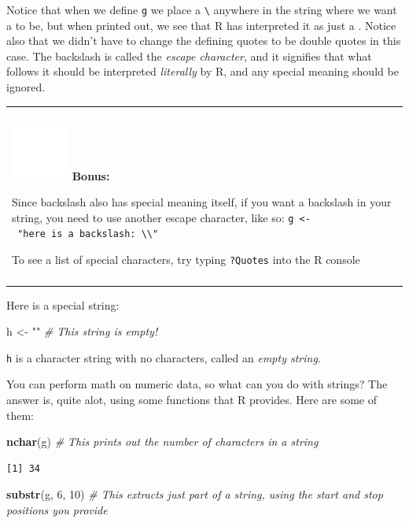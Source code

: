 \documentclass[
]{book}
\newenvironment{Shaded}{\begin{snugshade}}{\end{snugshade}}
\newcommand{\CommentTok}[1]{\textcolor[rgb]{0.56,0.35,0.01}{\textit{#1}}}
\newcommand{\DecValTok}[1]{\textcolor[rgb]{0.00,0.00,0.81}{#1}}
\newcommand{\KeywordTok}[1]{\textcolor[rgb]{0.13,0.29,0.53}{\textbf{#1}}}
\newcommand{\NormalTok}[1]{#1}
\newcommand{\StringTok}[1]{\textcolor[rgb]{0.31,0.60,0.02}{#1}}
\newenvironment{bonus}
{
  \begin{center}
  \begin{tabular}{|>{\columncolor{bonus}\color{white}}p{0.9\textwidth}|}\hline\\
  \includegraphics[scale=0.1]{src/images/sun-fill-invert.png}
  \textbf{Bonus:}
}
{\\\\\hline
  \end{tabular}
  \end{center}
}
\begin{document}
Notice that when we define \texttt{g} we place a \texttt{\textbackslash{}\textquotesingle{}} anywhere in the string where we want a \texttt{\textquotesingle{}} to be, but when printed out, we see that R has interpreted it as just a \texttt{\textquotesingle{}}.
Notice also that we didn't have to change the defining quotes to be double quotes in this case.
The backslash is called the \emph{escape character}, and it signifies that what follows it should be interpreted \emph{literally} by R, and any special meaning should be ignored.

\begin{bonus}
Since backslash also has special meaning itself, if you want a backslash
in your string, you need to use another escape character, like so:
\texttt{g\ \textless{}-\ "here\ is\ a\ backslash:\ \textbackslash{}\textbackslash{}"}

To see a list of special characters, try typing \texttt{?Quotes} into
the R console
\end{bonus}

Here is a special string:

\begin{Shaded}
\begin{Highlighting}[]
\NormalTok{h <-}\StringTok{ ""}              \CommentTok{# This string is empty!}
\end{Highlighting}
\end{Shaded}

\texttt{h} is a character string with no characters, called an \emph{empty string}.

You can perform math on numeric data, so what can you do with strings?
The answer is, quite alot, using some functions that R provides.
Here are some of them:

\begin{Shaded}
\begin{Highlighting}[]
\KeywordTok{nchar}\NormalTok{(g)   }\CommentTok{# This prints out the number of characters in a string}
\end{Highlighting}
\end{Shaded}

\begin{verbatim}
[1] 34
\end{verbatim}

\begin{Shaded}
\begin{Highlighting}[]
\KeywordTok{substr}\NormalTok{(g, }\DecValTok{6}\NormalTok{, }\DecValTok{10}\NormalTok{)   }\CommentTok{# This extracts just part of a string, using the start and stop positions you provide}
\end{Highlighting}
\end{Shaded}
\end{document}
